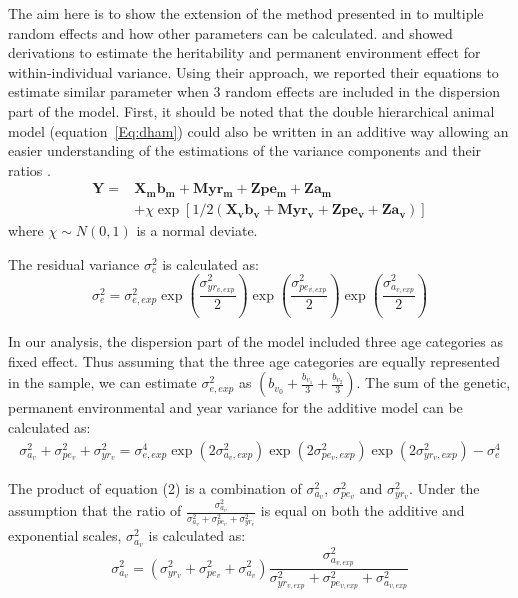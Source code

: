 \documentclass[a4paper,12pt,twoside]{article}
\begin{document}
	The aim here is to show the extension of the method presented in \citep{mulder_prediction_2007} to multiple random effects and how other parameters can be calculated.
	\cite{felleki_estimation_2012} and \cite{sae-lim_genetic_2015} showed derivations to estimate the heritability and permanent environment effect for within-individual variance.
	Using their approach, we reported their equations to estimate similar parameter when 3 random effects are included in the dispersion part of the model.
	First, it should be noted that the double hierarchical animal model (equation~\ref{Eq:dham}) could also be written in an additive way allowing an easier understanding of the estimations of the variance components and their ratios \citep{sancristobal-gaudy_prediction_1998}.
	\begin{equation}\label{Eq:dhamscg}
		\begin{aligned}
			\boldsymbol{Y} = &\boldsymbol{X_m b_m} + \boldsymbol{M yr_m} + \boldsymbol{Z pe_m} + \boldsymbol{Z a_m}\\
			&+ \chi \exp[1/2(\boldsymbol{X_v b_v} + \boldsymbol{M yr_v} + \boldsymbol{Z pe_v} + \boldsymbol{Z a_v})]
		\end{aligned}
	\end{equation}
	where $\chi \sim N(0,1)$ is a normal deviate.
	
	The residual variance $\sigma_e^2$ is calculated as:
	\begin{equation}
		\sigma_e^2 = \sigma_{e,exp}^2 \exp \left( \frac{\sigma_{yr_{v,exp}}^2}{2} \right) \exp \left( \frac{\sigma_{pe_{v,exp}}^2}{2} \right) \exp \left( \frac{\sigma_{a_{v,exp}}^2}{2} \right)
	\end{equation}
	
	In our analysis, the dispersion part of the model included three age categories as fixed effect.
	Thus assuming that the three age categories are equally represented in the sample, we can estimate $\sigma_{e,exp}^2$ as $\left( b_{v_0} + \frac{b_{v_1}}{3}+ \frac{b_{v_2}}{3} \right)$.
	The sum of the genetic, permanent environmental and year variance for the additive model can be calculated as:
	\begin{equation}
		\begin{aligned}
			\sigma_{a_v}^2 + \sigma_{pe_v}^2 + \sigma_{yr_v}^2 = \sigma_{e,exp}^4 \exp (2\sigma_{a_v,exp}^2)\exp (2\sigma_{pe_v,exp}^2)\exp (2\sigma_{yr_v,exp}^2) - \sigma_e^4
		\end{aligned}
	\end{equation}
	
	The product of equation (2) is a combination of $\sigma_{a_v}^2$, $\sigma_{pe_v}^2$ and $\sigma_{yr_v}^2$.
	Under the assumption that the ratio of $\frac{\sigma_{a_v}^2}{\sigma_{a_v}^2 + \sigma_{pe_v}^2 + \sigma_{yr_v}^2}$ is equal on both the additive and exponential scales, $\sigma_{a_v}^2$ is calculated as:
	\begin{equation}
		\sigma_{a_v}^2 = (\sigma_{yr_v}^2 + \sigma_{pe_v}^2 + \sigma_{a_v}^2 ) \frac{\sigma_{a_{v,exp}}^2}{\sigma_{yr_{v,exp}}^2 + \sigma_{pe_{v,exp}}^2 + \sigma_{a_{v,exp}}^2}
	\end{equation}
	
\end{document}
